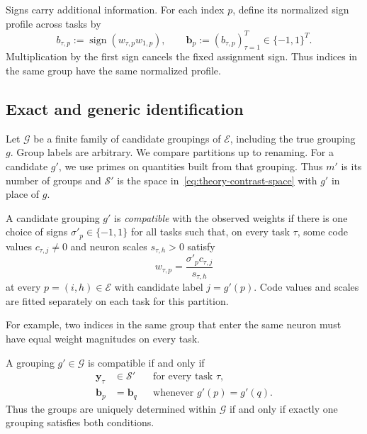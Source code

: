 Signs carry additional information. For each index $p$, define
its normalized sign profile across tasks by
\begin{equation}
    b_{\tau,p}:=\operatorname{sign}(w_{\tau,p}w_{1,p}),
    \qquad
    \mathbf b_p
      :=(b_{\tau,p})_{\tau=1}^T\in\{-1,1\}^T.
    \label{eq:theory-sign-profile}
\end{equation}
Multiplication by the first sign cancels the fixed assignment sign.
Thus indices in the same group have the same normalized profile.

\subsection{Exact and generic identification}
\label{sec:theory-recovery}

Let $\mathcal G$ be a finite family of candidate groupings of
$\mathcal E$, including the true grouping $g$. Group labels are
arbitrary. We compare partitions up to renaming. For a candidate
$g'$, we use primes on quantities built from that grouping. Thus
$m'$ is its number of groups and $\mathcal S'$ is the space
in~\eqref{eq:theory-contrast-space} with $g'$ in place of $g$.

\begin{definition}
    \label{def:theory-compatible-grouping}
    A candidate grouping $g'$ is \emph{compatible} with the observed
    weights if there is one choice of signs $\sigma'_p\in\{-1,1\}$
    for all tasks such that, on every task $\tau$, some code values
    $c_{\tau,j}\ne0$ and neuron scales $s_{\tau,h}>0$ satisfy
    \begin{equation*}
        w_{\tau,p}=\frac{\sigma'_p c_{\tau,j}}{s_{\tau,h}}
    \end{equation*}
    at every $p=(i,h)\in\mathcal E$ with candidate label $j=g'(p)$.
    Code values and scales are fitted separately on each task for this partition.
\end{definition}

For example, two indices in the same group that enter the same neuron
must have equal weight magnitudes on every task.

\begin{theorem}
    \label{thm:theory-finite-identification}
    A grouping $g'\in\mathcal G$ is compatible if and only if
    \begin{equation}
        \begin{aligned}
            \mathbf y_\tau&\in\mathcal S'
                &&\text{for every task }\tau,\\
            \mathbf b_p&=\mathbf b_q
                &&\text{whenever }g'(p)=g'(q).
        \end{aligned}
        \label{eq:theory-compatibility}
    \end{equation}
    Thus the groups are uniquely determined within $\mathcal G$
    if and only if exactly one grouping satisfies both conditions.

\end{theorem}

